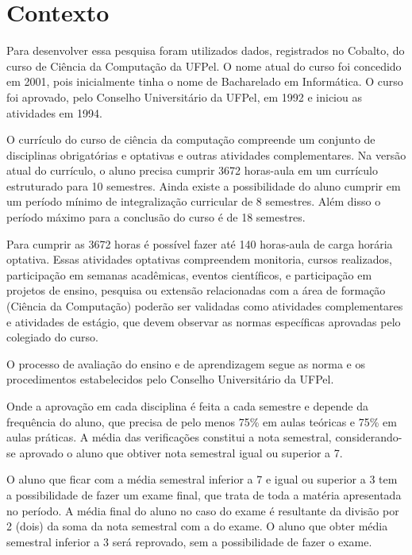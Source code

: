 \documentclass[diss,capa]{texufpel}
\begin{document}
\section{Contexto}
\label{sec:contexto}

Para desenvolver essa pesquisa foram utilizados dados, registrados no Cobalto, do curso de Ciência da Computação da UFPel.
O nome atual do curso foi concedido em 2001, pois inicialmente tinha o nome de Bacharelado em Informática.
O curso foi aprovado, pelo Conselho Universitário da UFPel, em 1992 e iniciou as atividades em 1994.

O currículo do curso de ciência da computação compreende um conjunto de disciplinas obrigatórias e optativas e outras atividades complementares.
Na versão atual do currículo, o aluno precisa cumprir 3672 horas-aula em um currículo estruturado para 10 semestres.
Ainda existe a possibilidade do aluno cumprir em um período mínimo de integralização curricular de 8 semestres.
Além disso o período máximo para a conclusão do curso é de 18 semestres.

Para cumprir as 3672 horas é possível fazer até 140 horas-aula de carga horária optativa.
Essas atividades optativas compreendem monitoria, cursos realizados, participação em semanas acadêmicas, eventos científicos, e participação em projetos de ensino, pesquisa ou extensão relacionadas com a área de formação (Ciência da Computação) poderão ser validadas como atividades complementares e atividades de estágio, que devem observar as normas específicas aprovadas pelo colegiado do curso.

O processo de avaliação do ensino e de aprendizagem segue as norma e os procedimentos estabelecidos pelo Conselho Universitário da UFPel.

Onde a aprovação em cada disciplina é feita a cada semestre e depende da frequência do aluno, que precisa de pelo menos 75\% em aulas teóricas e 75\% em aulas práticas.
A média das verificações constitui a nota semestral, considerando-se aprovado o aluno que obtiver nota semestral igual ou superior a 7.

O aluno que ficar com a média semestral inferior a 7 e igual ou superior a 3 tem a possibilidade de fazer um exame final, que trata de toda a matéria apresentada no período.
A média final do aluno no caso do exame é resultante da divisão por 2 (dois) da soma da nota semestral com a do exame.
O aluno que obter média semestral inferior a 3 será reprovado, sem a possibilidade de fazer o exame.
\end{document}
